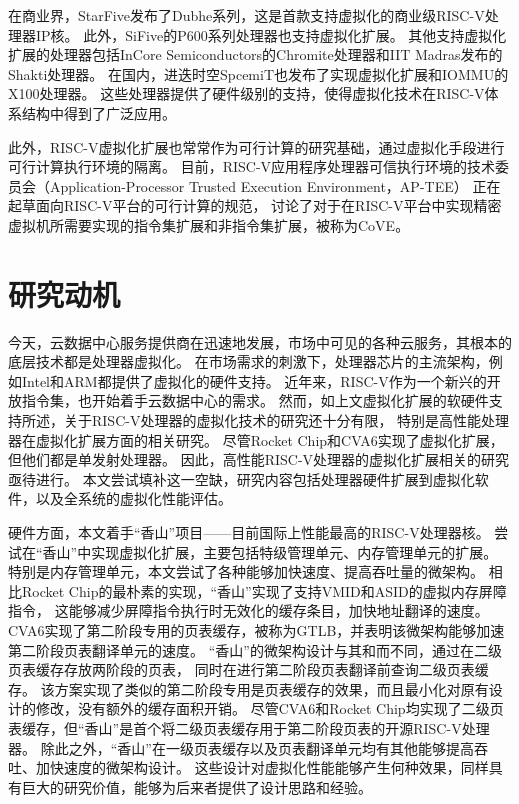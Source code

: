 在商业界，StarFive发布了Dubhe系列，这是首款支持虚拟化的商业级RISC-V处理器IP核。
此外，SiFive的P600系列处理器也支持虚拟化扩展。
其他支持虚拟化扩展的处理器包括InCore Semiconductors的Chromite处理器和IIT Madras发布的Shakti处理器。
在国内，进迭时空SpcemiT也发布了实现虚拟化扩展和IOMMU的X100处理器。
这些处理器提供了硬件级别的支持，使得虚拟化技术在RISC-V体系结构中得到了广泛应用。

此外，RISC-V虚拟化扩展也常常作为可行计算的研究基础，通过虚拟化手段进行可行计算执行环境的隔离。
目前，RISC-V应用程序处理器可信执行环境的技术委员会（Application-Processor Trusted Execution Environment，AP-TEE）
正在起草面向RISC-V平台的可行计算的规范，
讨论了对于在RISC-V平台中实现精密虚拟机所需要实现的指令集扩展和非指令集扩展，被称为CoVE\cite{sahita2023cove}。
\section{研究动机}

今天，云数据中心服务提供商在迅速地发展，市场中可见的各种云服务，其根本的底层技术都是处理器虚拟化。
在市场需求的刺激下，处理器芯片的主流架构，例如Intel和ARM都提供了虚拟化的硬件支持。
近年来，RISC-V作为一个新兴的开放指令集，也开始着手云数据中心的需求。
然而，如上文虚拟化扩展的软硬件支持所述，关于RISC-V处理器的虚拟化技术的研究还十分有限，
特别是高性能处理器在虚拟化扩展方面的相关研究。
尽管Rocket Chip和CVA6实现了虚拟化扩展，但他们都是单发射处理器。
因此，高性能RISC-V处理器的虚拟化扩展相关的研究亟待进行。
本文尝试填补这一空缺，研究内容包括处理器硬件扩展到虚拟化软件，以及全系统的虚拟化性能评估。

硬件方面，本文着手“香山”项目——目前国际上性能最高的RISC-V处理器核。
尝试在“香山”中实现虚拟化扩展，主要包括特级管理单元、内存管理单元的扩展。
特别是内存管理单元，本文尝试了各种能够加快速度、提高吞吐量的微架构。
相比Rocket Chip的最朴素的实现，“香山”实现了支持VMID和ASID的虚拟内存屏障指令，
这能够减少屏障指令执行时无效化的缓存条目，加快地址翻译的速度。
CVA6实现了第二阶段专用的页表缓存，被称为GTLB，并表明该微架构能够加速第二阶段页表翻译单元的速度。
“香山”的微架构设计与其和而不同，通过在二级页表缓存存放两阶段的页表，
同时在进行第二阶段页表翻译前查询二级页表缓存。
该方案实现了类似的第二阶段专用是页表缓存的效果，而且最小化对原有设计的修改，没有额外的缓存面积开销。
尽管CVA6和Rocket Chip均实现了二级页表缓存，但“香山”是首个将二级页表缓存用于第二阶段页表的开源RISC-V处理器。
除此之外，“香山”在一级页表缓存以及页表翻译单元均有其他能够提高吞吐、加快速度的微架构设计。
这些设计对虚拟化性能能够产生何种效果，同样具有巨大的研究价值，能够为后来者提供了设计思路和经验。

